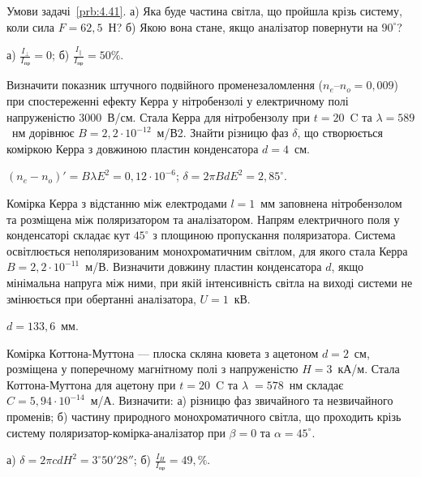 \begin{problem}%
    Умови задачі~\ref{prb:4.41}. а) Яка буде частина світла, що пройшла крізь
    систему, коли сила $ F = 62,5 $~Н? б) Якою вона стане, якщо аналізатор
    повернути на $ 90^\circ $?
    \begin{solution}
         а)  $ \frac{I_\perp}{I_\text{пр}} = 0 $; б) $\frac{I_\parallel}{I_\text{пр}} = 50\% $.
    \end{solution}
\end{problem}

\begin{problem}%
     Визначити показник штучного подвійного променезаломлення ($ n_e – n_o = 0,009 $) при спостереженні ефекту Керра у нітробензолі у електричному полі напруженістю $ 3000 $~В/см. Стала Керра для нітробензолу при $ t = 20$~\textdegree C  та $ \lambda = 589 $~нм дорівнює $ B = 2,2\cdot10^{-12} $~м/В2. Знайти різницю фаз $ \delta $, що створюється коміркою Керра з довжиною пластин конденсатора $ d = 4 $~см.
    \begin{solution}
        $ (n_e - n_o)' = B\lambda E^2 = 0,12 \cdot 10^{-6} $; $ \delta = 2\pi BdE^2 = 2,85^\circ $.
    \end{solution}
\end{problem}

\begin{problem}%
    Комірка Керра з відстанню між електродами $ l = 1 $~мм заповнена нітробензолом та розміщена між поляризатором та аналізатором. Напрям електричного поля у конденсаторі складає кут $ 45^\circ $ з площиною пропускання поляризатора. Система освітлюється неполяризованим монохроматичним світлом, для якого стала Керра $ B = 2,2\cdot10^{-11} $~м/В. Визначити довжину пластин конденсатора $ d $, якщо мінімальна напруга між ними, при якій інтенсивність світла на виході системи не змінюється при обертанні аналізатора, $ U = 1 $~кВ.
    \begin{solution}
        $ d = 133,6 $~мм.
    \end{solution}
\end{problem}

\begin{problem}%
     Комірка Коттона-Муттона --- плоска скляна кювета з ацетоном $ d = 2 $~см, розміщена у поперечному магнітному полі з напруженістю $ H = 3 $~кА/м. Стала Коттона-Муттона для ацетону при $ t = 20 $~\textdegree C та $ \lambda= 578 $~нм складає $ C = 5,94\cdot10^{-14} $~м/А. Визначити: а) різницю фаз звичайного та незвичайного променів; б) частину природного монохроматичного світла, що проходить крізь систему поляризатор-комірка-аналізатор при $ \beta = 0 $ та $ \alpha = 45^\circ $.
    \begin{solution}
        а) $ \delta = 2\pi cdH^2 = 3^\circ50'28'' $; б) $ \frac{I_H}{I_\text{пр}} = 49,\% $.
    \end{solution}
\end{problem}

